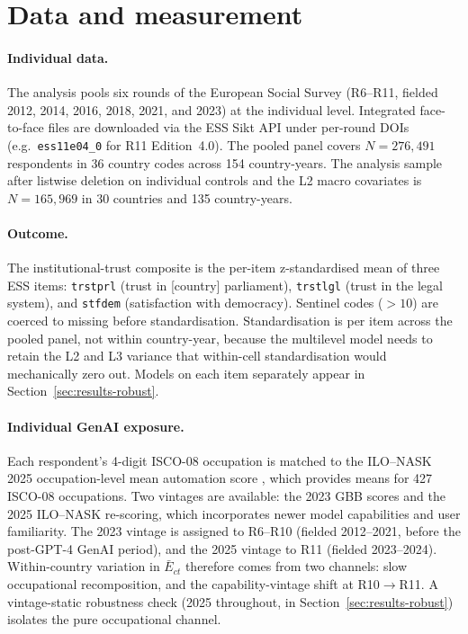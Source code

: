 \section{Data and measurement}\label{sec:data}

\paragraph{Individual data.}
The analysis pools six rounds of the European Social Survey (R6--R11,
fielded 2012, 2014, 2016, 2018, 2021, and 2023) at the individual level.
Integrated face-to-face files are downloaded via the ESS Sikt API under
per-round DOIs (e.g.\ \texttt{ess11e04\_0} for R11 Edition~4.0). The
pooled panel covers $N=276{,}491$ respondents in 36 country codes
across 154 country-years. The analysis sample after listwise deletion
on individual controls and the L2 macro covariates is $N=165{,}969$ in
30 countries and 135 country-years.

\paragraph{Outcome.}
The institutional-trust composite is the per-item z-standardised mean
of three ESS items: \texttt{trstprl} (trust in [country] parliament),
\texttt{trstlgl} (trust in the legal system), and \texttt{stfdem}
(satisfaction with democracy). Sentinel codes ($>10$) are coerced to
missing before standardisation. Standardisation is per item across the
pooled panel, not within country-year, because the multilevel model
needs to retain the L2 and L3 variance that within-cell standardisation
would mechanically zero out. Models on each item separately appear in
Section~\ref{sec:results-robust}.

\paragraph{Individual GenAI exposure.}
Each respondent's 4-digit ISCO-08 occupation is matched to the
ILO--NASK 2025 occupation-level mean automation score
\citep{Gmyrek2025}, which provides means for 427 ISCO-08 occupations.
Two vintages are available: the 2023 GBB scores \citep{Gmyrek2023} and
the 2025 ILO--NASK re-scoring, which incorporates newer model
capabilities and user familiarity. The 2023 vintage is assigned to
R6--R10 (fielded 2012--2021, before the post-GPT-4 GenAI period), and
the 2025 vintage to R11 (fielded 2023--2024). Within-country variation
in $\bar E_{ct}$ therefore comes from two channels: slow occupational
recomposition, and the capability-vintage shift at R10$\to$R11. A
vintage-static robustness check (2025 throughout, in
Section~\ref{sec:results-robust}) isolates the pure occupational
channel.

